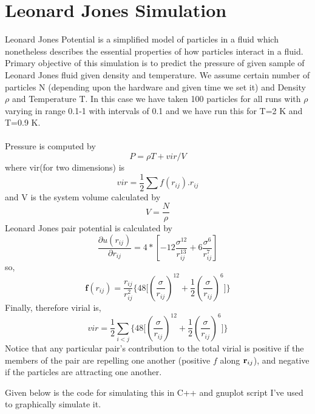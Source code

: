 \documentclass[]{report}
\begin{document}
\section*{Leonard Jones Simulation}
	Leonard Jones Potential is a simplified model of particles in a fluid which nonetheless describes the essential properties of how particles interact in a fluid. Primary objective of this simulation is to predict the pressure of given sample of Leonard Jones fluid given density and temperature. We assume certain number of particles N (depending upon the hardware and given time we set it) and Density $\rho$ and Temperature T. In this case we have taken 100 particles for all runs with $\rho$ varying in range 0.1-1 with intervals of 0.1 and we have run this for T=2 K and T=0.9 K. \paragraph{}
	Pressure is computed by \[P = \rho T + vir/V \] where vir(for two dimensions) is \[vir = \frac{1}{2}\sum f(r_{ij}).r_{ij}\] and V is the system volume calculated by \[V = \frac{N}{\rho}\]
	Leonard Jones pair potential is calculated by 
	\[ \frac{\partial u(r_{ij})}{\partial r_{ij}} = 4*[-12\frac{\sigma^{12}}{r^{13}_{ij}} + 6\frac{\sigma^{6}}{r^{7}_{ij}}]\]
	so, 
	\[ \textbf{f}(r_{ij}) = \frac{r_{ij}}{r_{ij}^2}  \big\{ 48 \big[\left(\frac{\sigma}{r_{ij}} \right)^{12} + \frac{1}{2} \left( \frac{\sigma}{r_{ij}} \right)^6 \big] \big\} \]
	Finally, therefore virial is, 
	\[ vir = \frac{1}{2} \sum_{i<j}  \big\{48\big[\left(\frac{\sigma}{r_{ij}} \right)^{12} + \frac{1}{2} \left( \frac{\sigma}{r_{ij}} \right)^6  \big] \big\} \]
	Notice that any particular pair's contribution to the total virial is positive if the members of the pair are repelling one another (positive $f$ along ${\bf r}_{ij}$), and negative if the particles are attracting one another.
	
	Given below is the code for simulating this in C++ and gnuplot script I've used to graphically simulate it.
\newpage	
\end{document}
